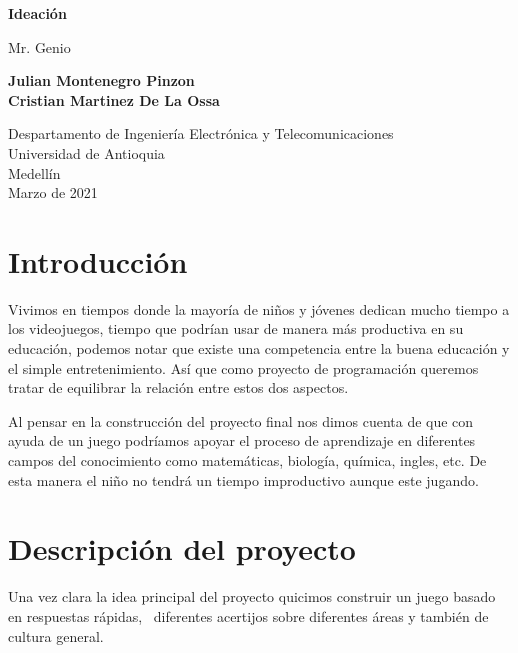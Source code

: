 \documentclass{article}
\begin{document}
\begin{titlepage}
    \begin{center}
        \vspace*{1cm}
            
        \Huge
        \textbf{Ideación}
            
        \vspace{0.5cm}
        \LARGE
        Mr. Genio
            
        \vspace{1.5cm}
            
        \textbf{Julian Montenegro Pinzon}\\
        
        
        \textbf{Cristian Martinez De La Ossa}
        
            
        \vfill
            
        \vspace{0.8cm}
            
        \Large
        Despartamento de Ingeniería Electrónica y Telecomunicaciones\\
        Universidad de Antioquia\\
        Medellín\\
        Marzo de 2021
            
    \end{center}
\end{titlepage}

\tableofcontents
\newpage
\section{Introducción}\label{intro}
Vivimos en tiempos donde la mayoría de niños y jóvenes dedican mucho tiempo a los videojuegos, tiempo que podrían usar de manera más productiva en su educación, podemos notar que existe una competencia entre la buena educación y el simple entretenimiento. Así que como proyecto de programación queremos tratar de equilibrar la relación entre estos dos aspectos.

Al pensar en la construcción del proyecto final nos dimos cuenta de que con ayuda de un juego podríamos apoyar el proceso de aprendizaje en diferentes campos del conocimiento como matemáticas, biología, química, ingles, etc. De esta manera el niño no tendrá un tiempo improductivo aunque este jugando.

\section{Descripción del proyecto} \label{contenido}
Una vez clara la idea principal del proyecto quicimos construir un juego basado en respuestas rápidas,  diferentes acertijos sobre diferentes áreas y también de cultura general.
\end{document}
